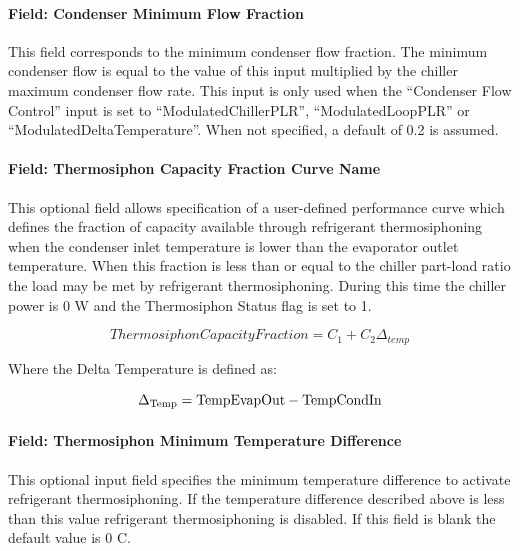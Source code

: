 \paragraph{Field: Condenser Minimum Flow Fraction}

This field corresponds to the minimum condenser flow fraction. The minimum condenser flow is equal to the value of this input multiplied by the chiller maximum condenser flow rate. This input is only used when the ``Condenser Flow Control'' input is set to ``ModulatedChillerPLR'', ``ModulatedLoopPLR'' or ``ModulatedDeltaTemperature''. When not specified, a default of 0.2 is assumed.

\paragraph{Field: Thermosiphon Capacity Fraction Curve Name}\label{thermosiphon-capacity-fraction-curve-name4}

This optional field allows specification of a user-defined performance curve which defines the fraction of capacity available through refrigerant thermosiphoning when the condenser inlet temperature is lower than the evaporator outlet temperature. When this fraction is less than or equal to the chiller part-load ratio the load may be met by refrigerant thermosiphoning. During this time the chiller power is 0 W and the Thermosiphon Status flag is set to 1.

\begin{equation}
    ThermosiphonCapacityFraction = {C_1} + {C_2}{\Delta_{temp}}
\end{equation}

Where the Delta Temperature is defined as:

\begin{equation}
{\Delta_{{\rm{Temp}}}}
    = {\rm{TempEvapOut  -  TempCondIn }}
\end{equation}

\paragraph{Field: Thermosiphon Minimum Temperature Difference}\label{thermosiphon-minimum-temperature-difference4}

This optional input field specifies the minimum temperature difference to activate refrigerant thermosiphoning. If the temperature difference described above is less than this value refrigerant thermosiphoning is disabled. If this field is blank the default value is 0 C.


